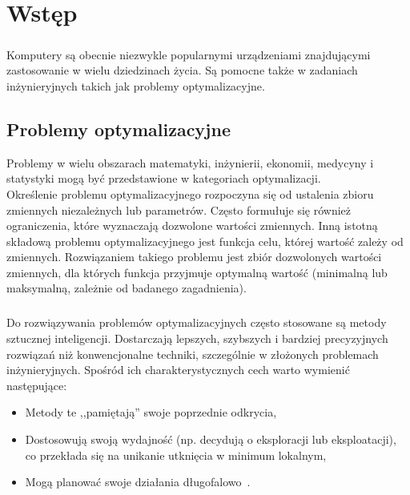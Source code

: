 \chapter*{Wstęp}
\paragraph{}Komputery są obecnie niezwykle popularnymi urządzeniami znajdującymi zastosowanie w wielu dziedzinach życia. Są pomocne także w zadaniach inżynieryjnych takich jak problemy optymalizacyjne.
\section*{Problemy optymalizacyjne}
Problemy w wielu obszarach matematyki, inżynierii, ekonomii, medycyny i statystyki mogą być przedstawione w kategoriach optymalizacji.\\
Określenie problemu optymalizacyjnego rozpoczyna się od ustalenia zbioru zmiennych niezależnych lub parametrów. Często formułuje się również ograniczenia, które wyznaczają dozwolone wartości zmiennych. Inną istotną składową problemu optymalizacyjnego jest funkcja celu, której wartość zależy od zmiennych. Rozwiązaniem takiego problemu jest zbiór dozwolonych wartości zmiennych, dla których funkcja przyjmuje optymalną wartość (minimalną lub maksymalną, zależnie od badanego zagadnienia)\cite{9780122839528}.
\paragraph{} Do rozwiązywania problemów optymalizacyjnych często stosowane są metody sztucznej inteligencji. Dostarczają lepszych, szybszych i bardziej precyzyjnych rozwiązań niż konwencjonalne techniki, szczególnie w złożonych problemach inżynieryjnych. Spośród ich charakterystycznych cech warto wymienić następujące:
\begin{itemize}
	\item Metody te ,,pamiętają'' swoje poprzednie odkrycia,
	\item Dostosowują swoją wydajność (np. decydują o eksploracji lub eksploatacji), co przekłada się na unikanie utknięcia w minimum lokalnym,
	\item Mogą planować swoje działania długofalowo~\cite{Badar2013StudyOA}.
\end{itemize}
